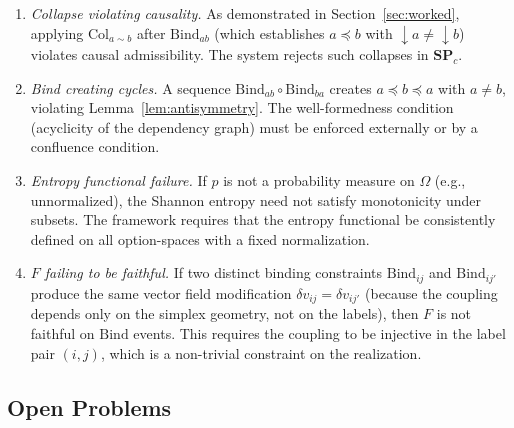 \documentclass[12pt,a4paper]{article}
\theoremstyle{definition}
\theoremstyle{remark}
\newcommand{\SP}{\mathbf{SP}}
\newcommand{\Bind}{\ensuremath{\mathrm{Bind}}}
\newcommand{\Col}{\ensuremath{\mathrm{Col}}}
\newcommand{\vF}{v}
\newcommand{\downset}[1]{\!\downarrow\!{#1}}
\begin{document}
\begin{enumerate}[label=(\roman*)]
\item \textit{Collapse violating causality.} As demonstrated in
  Section~\ref{sec:worked}, applying $\Col_{a\sim b}$ after $\Bind_{ab}$ (which
  establishes $a\preceq b$ with $\downset{a}\ne\downset{b}$) violates causal
  admissibility. The system rejects such collapses in $\SP_c$.
\item \textit{Bind creating cycles.} A sequence $\Bind_{ab}\circ\Bind_{ba}$ creates
  $a\preceq b\preceq a$ with $a\ne b$, violating Lemma~\ref{lem:antisymmetry}. The
  well-formedness condition (acyclicity of the dependency graph) must be enforced
  externally or by a confluence condition.
\item \textit{Entropy functional failure.} If $p$ is not a probability measure on
  $\Omega$ (e.g., unnormalized), the Shannon entropy need not satisfy monotonicity
  under subsets. The framework requires that the entropy functional be consistently
  defined on all option-spaces with a fixed normalization.
\item \textit{$F$ failing to be faithful.} If two distinct binding constraints
  $\Bind_{ij}$ and $\Bind_{ij'}$ produce the same vector field modification
  $\delta\vF_{ij}=\delta\vF_{ij'}$ (because the coupling depends only on the simplex
  geometry, not on the labels), then $F$ is not faithful on $\Bind$ events. This
  requires the coupling to be injective in the label pair $(i,j)$, which is a
  non-trivial constraint on the realization.
\end{enumerate}

\subsection{Open Problems}
\end{document}
